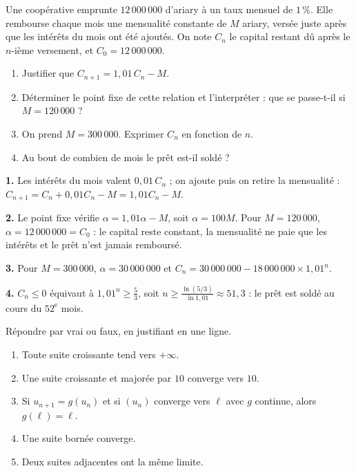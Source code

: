 \begin{jecherche}
Une coopérative emprunte $12\,000\,000$ d'ariary à un taux mensuel de
$1\,\%$. Elle rembourse chaque mois une mensualité constante de $M$ ariary,
versée juste après que les intérêts du mois ont été ajoutés. On note $C_{n}$
le capital restant dû après le $n$-ième versement, et $C_{0} = 12\,000\,000$.

\begin{enumerate}[label=\textbf{\arabic*.}, leftmargin=*, itemsep=0.3em]
  \item Justifier que $C_{n+1} = 1{,}01\,C_{n}-M$.
  \item Déterminer le point fixe de cette relation et l'interpréter : que se
        passe-t-il si $M = 120\,000$ ?
  \item On prend $M = 300\,000$. Exprimer $C_{n}$ en fonction de $n$.
  \item Au bout de combien de mois le prêt est-il soldé ?
\end{enumerate}
\end{jecherche}

\begin{corrige}
\textbf{1.} Les intérêts du mois valent $0{,}01\,C_{n}$ ; on ajoute puis on
retire la mensualité : $C_{n+1} = C_{n}+0{,}01C_{n}-M = 1{,}01C_{n}-M$.

\textbf{2.} Le point fixe vérifie $\alpha = 1{,}01\alpha-M$, soit
$\alpha = 100M$. Pour $M = 120\,000$, $\alpha = 12\,000\,000 = C_{0}$ : le
capital reste constant, la mensualité ne paie que les intérêts et le prêt
n'est jamais remboursé.

\textbf{3.} Pour $M = 300\,000$, $\alpha = 30\,000\,000$ et
$C_{n} = 30\,000\,000-18\,000\,000\times1{,}01^{n}$.

\textbf{4.} $C_{n} \leq 0$ équivaut à $1{,}01^{n} \geq \frac53$, soit
$n \geq \frac{\ln(5/3)}{\ln1{,}01} \approx 51{,}3$ : le prêt est soldé au
cours du $52^{\text{e}}$ mois.
\end{corrige}

\begin{jemeteste}
Répondre par vrai ou faux, en justifiant en une ligne.

\begin{enumerate}[label=\textbf{\arabic*.}, leftmargin=*, itemsep=0.28em]
  \item Toute suite croissante tend vers $+\infty$.
  \item Une suite croissante et majorée par $10$ converge vers $10$.
  \item Si $u_{n+1} = g(u_{n})$ et si $(u_{n})$ converge vers $\ell$ avec $g$
        continue, alors $g(\ell) = \ell$.
  \item Une suite bornée converge.
  \item Deux suites adjacentes ont la même limite.
\end{enumerate}
\end{jemeteste}

